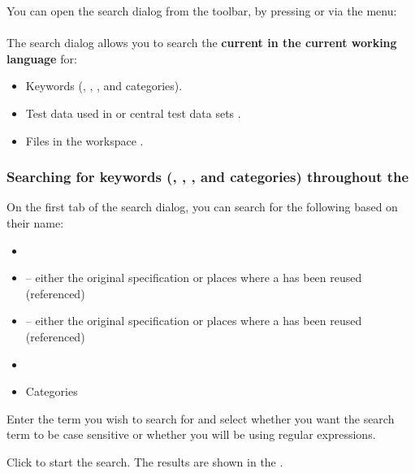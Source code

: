 You can open the search dialog from the toolbar, by pressing  or via the menu:\\
\\

The search dialog allows you to search the \textbf{current \gdproject{} in the  current working language} for:

\begin{itemize}
\item Keywords  (\gdcases{}, \gdsteps{}, \gdsuites{}, \gdjobs{} and categories).
\item Test data used in \gdcases{} or central test data sets .
\item Files in the workspace .
\end{itemize}


\subsubsection{Searching for keywords (\gdcases{}, \gdsteps{}, \gdsuites{}, \gdjobs{} and categories) throughout the \gdproject{}}
\label{TasksSearchKeywords}

On the first tab of the search dialog, you can search for the following based on their name:

\begin{itemize}
\item \gdsteps{}
\item \gdcases{} -- either the original specification or places where a \gdcase{} has been reused (referenced)
\item \gdsuites{} -- either the original specification or places where a \gdsuite{} has been reused (referenced)
\item \gdjobs{}
\item Categories
\end{itemize}

Enter the term you wish to search for and select whether you want the search term to be case sensitive or whether you will be using regular expressions. 

Click  to start the search. The results are shown in the \gdsearchresultview{} . 

